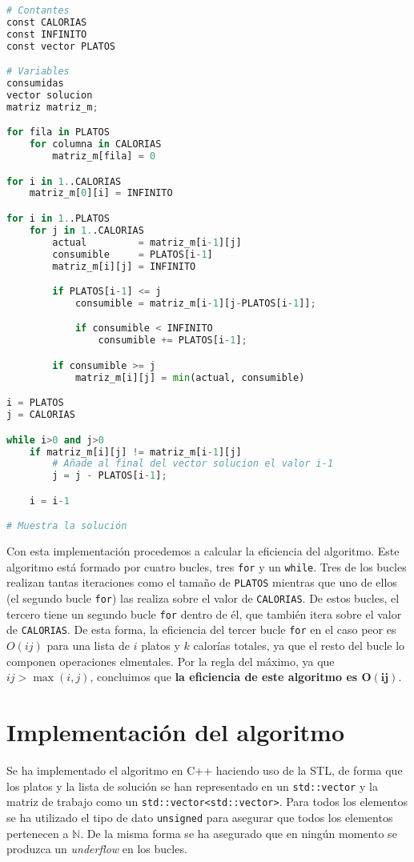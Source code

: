 \begin{lstlisting}[language=Python]
# Contantes
const CALORIAS
const INFINITO
const vector PLATOS

# Variables
consumidas
vector solucion
matriz matriz_m;

for fila in PLATOS
	for columna in CALORIAS
		matriz_m[fila] = 0

for i in 1..CALORIAS
	matriz_m[0][i] = INFINITO

for i in 1..PLATOS
	for j in 1..CALORIAS
		actual         = matriz_m[i-1][j]
		consumible     = PLATOS[i-1]
		matriz_m[i][j] = INFINITO

		if PLATOS[i-1] <= j
			consumible = matriz_m[i-1][j-PLATOS[i-1]];

			if consumible < INFINITO
				consumible += PLATOS[i-1];

		if consumible >= j
			matriz_m[i][j] = min(actual, consumible)

i = PLATOS
j = CALORIAS

while i>0 and j>0
	if matriz_m[i][j] != matriz_m[i-1][j]
		# Añade al final del vector solucion el valor i-1
		j = j - PLATOS[i-1];

	i = i-1

# Muestra la solución
\end{lstlisting}

Con esta implementación procedemos a calcular la eficiencia del algoritmo.
Este algoritmo está formado por cuatro bucles, tres \texttt{for} y un \texttt{while}.
Tres de los bucles realizan tantas iteraciones como el tamaño de \texttt{PLATOS} mientras que uno de ellos (el segundo bucle \texttt{for}) las realiza sobre el valor de \texttt{CALORIAS}.
De estos bucles, el tercero tiene un segundo bucle \texttt{for} dentro de él, que también itera sobre el valor de \texttt{CALORIAS}.
De esta forma, la eficiencia del tercer bucle \texttt{for} en el caso peor es $O(ij)$ para una lista de $i$ platos y $k$ calorías totales, ya que el resto del bucle lo componen operaciones elmentales.
Por la regla del máximo, ya que $ij>\max(i,j)$, concluimos que \textbf{la eficiencia de este algoritmo es $\boldsymbol{O(ij)}$}.

\section{Implementación del algoritmo}

Se ha implementado el algoritmo en C++ haciendo uso de la STL, de forma que los platos y la lista de solución se han representado en un \texttt{std::vector} y la matriz de trabajo como un \texttt{std::vector<std::vector>}.
Para todos los elementos se ha utilizado el tipo de dato \texttt{unsigned} para asegurar que todos los elementos pertenecen a $\mathbb{N}$.
De la misma forma se ha asegurado que en ningún momento se produzca un \textit{underflow} en los bucles.

